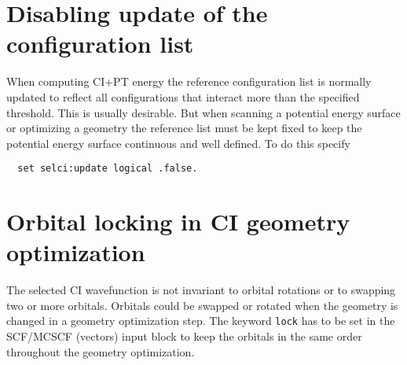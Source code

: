 \section{Disabling update of the configuration list}

When computing CI+PT energy the reference configuration list is
normally updated to reflect all configurations that interact more than
the specified threshold.  This is usually desirable.  But when
scanning a potential energy surface or optimizing a geometry the
reference list must be kept fixed to keep the potential energy surface
continuous and well defined.  To do this specify
\begin{verbatim}
  set selci:update logical .false.
\end{verbatim}

\section{Orbital locking in CI geometry optimization}

The selected CI wavefunction is not invariant to orbital rotations or 
to swapping two or more orbitals. Orbitals could be swapped or rotated
when the geometry is changed in a geometry optimization step. The keyword 
\verb#lock# has to be set in the SCF/MCSCF (vectors) input block to keep the
orbitals in the same order throughout the geometry optimization.
